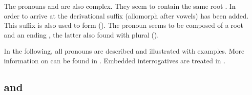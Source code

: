 The pronouns  and  are also complex. They seem to contain the same root . In order to arrive at  the derivational suffix  (allomorph \mbox{} after vowels) has been added. This suffix is also used to form  (). The pronoun  seems to be composed of a root  and an ending , the latter also found with plural  ().

In the following, all pronouns are described and illustrated with examples. More information on  can be found in . Embedded interrogatives are treated in .



\subsection{  and  }
\label{ssec:ca who and ce what}


